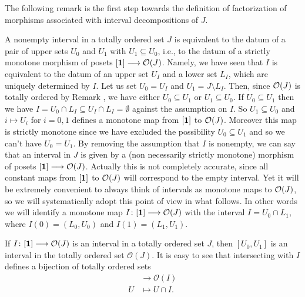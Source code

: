 The following remark is the first step towards the definition of factorization of morphisms associated with interval decompositions of $J$.
\begin{remark}
A nonempty interval in a totally ordered set $J$ is equivalent to the datum of a pair of upper sets $U_0$ and $U_1$ with $U_1\subseteq U_0$, i.e., to the datum of a strictly monotone morphism of posets $[\mathbf{1}] \longrightarrow \mathcal{O}(J)$. Namely, we have seen that $I$ is equivalent to the datum of an upper set $U_I$ and a lower set $L_I$, which are uniquely determined by $I$. Let us set $U_0=U_I$ and $U_1=J\setminus L_I$. Then, since $\mathcal{O}(J)$ is totally ordered by Remark , we have either $U_0\subseteq U_1$ or $U_1\subseteq U_0$. If $U_0\subseteq U_1$ then we have $I=U_0\cap L_I\subseteq U_I\cap L_I=\emptyset$ against the assumption on $I$. So $U_1\subseteq U_0$ and $i\mapsto U_i$ for $i=0,1$ defines a monotone map from $[\mathbf{1}] $ to $\mathcal{O}(J)$. Moreover this map is strictly monotone since we have excluded the possibility $U_0\subseteq U_1$ and so we can't have $U_0=U_1$. By removing the assumption that $I$ is nonempty, we can say that an interval in $J$ is given by a (non necessarily strictly monotone) morphism of posets $[\mathbf{1}] \longrightarrow \mathcal{O}(J)$. Actually this is not completely accurate, since all constant maps from $[\mathbf{1}] $ to $\mathcal{O}(J)$ will correspond to the empty interval. Yet it will be extremely convenient to always think of intervals as monotone maps to $\mathcal{O}(J)$, so we will systematically adopt this point of view in what follows. In other words we will identify a monotone map $I\colon[\mathbf{1}] \longrightarrow \mathcal{O}(J)$ with the interval $I=U_0\cap L_1$, where $I(0)=(L_0,U_0)$ and $I(1)=(L_1,U_1)$.
\end{remark}

\begin{remark}\label{oi.vs.oj}If $I\colon [\mathbf{1}] \longrightarrow \mathcal{O}(J)$ is an interval in a totally ordered set $J$, then $[U_0,U_1]$ is an interval in the totally ordered set $\mathcal{O}(J)$. It is easy to see that intersecting with $I$ defines a bijection of totally ordered sets
\begin{align*}
[U_0,U_1]&\to \mathcal{O}(I)\\
U&\mapsto U\cap I.
\end{align*}
\end{remark}

